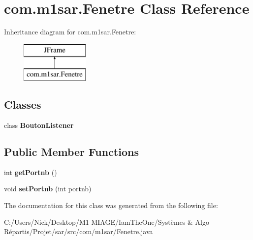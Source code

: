 \hypertarget{classcom_1_1m1sar_1_1_fenetre}{}\section{com.\+m1sar.\+Fenetre Class Reference}
\label{classcom_1_1m1sar_1_1_fenetre}
Inheritance diagram for com.\+m1sar.\+Fenetre\+:\begin{figure}[H]
\begin{center}
\leavevmode
\includegraphics[height=2.000000cm]{classcom_1_1m1sar_1_1_fenetre}
\end{center}
\end{figure}
\subsection*{Classes}
\begin{DoxyCompactItemize}
\item 
class {\bfseries Bouton\+Listener}
\end{DoxyCompactItemize}
\subsection*{Public Member Functions}
\begin{DoxyCompactItemize}
\item 
\mbox{\label{classcom_1_1m1sar_1_1_fenetre_ae780b07fb90122c68bcf59db05c1b615}} 
int {\bfseries get\+Portnb} ()
\item 
\mbox{\label{classcom_1_1m1sar_1_1_fenetre_a8503e7f3d964cdd44447127e5129325b}} 
void {\bfseries set\+Portnb} (int portnb)
\end{DoxyCompactItemize}


The documentation for this class was generated from the following file\+:\begin{DoxyCompactItemize}
\item 
C\+:/\+Users/\+Nick/\+Desktop/\+M1 M\+I\+A\+G\+E/\+Iam\+The\+One/\+Systèmes \& Algo Répartis/\+Projet/sar/src/com/m1sar/Fenetre.\+java\end{DoxyCompactItemize}
